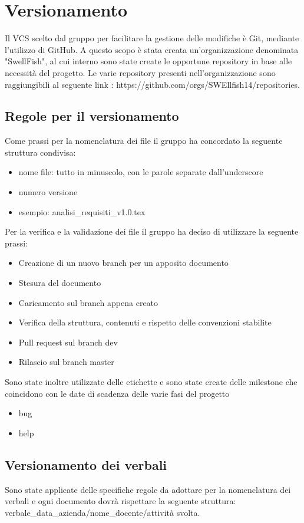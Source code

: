 \documentclass[12pt]{article}
\begin{document}
\section{Versionamento}
Il VCS scelto dal gruppo per facilitare la gestione delle modifiche è Git, mediante l'utilizzo di GitHub.
A questo scopo è stata creata un'organizzazione denominata "SwellFish", al cui interno sono state create le opportune repository in base alle necessità del progetto.
Le varie repository presenti nell'organizzazione sono raggiungibili al seguente link : https://github.com/orgs/SWEllfish14/repositories.
\subsection{Regole per il versionamento}
Come prassi per la nomenclatura dei file il gruppo ha concordato la seguente struttura condivisa:
\begin{itemize}
    \item nome file: tutto in minuscolo, con le parole separate dall'underscore
    \item numero versione
    \item esempio: analisi_requisiti_v1.0.tex
\end{itemize}

Per la verifica e la validazione dei file il gruppo ha deciso di utilizzare la seguente prassi:
\begin{itemize}
    \item Creazione di un nuovo branch per un apposito documento
    \item Stesura del documento
    \item Caricamento sul branch appena creato
    \item Verifica della struttura, contenuti e rispetto delle convenzioni stabilite
    \item Pull request sul branch dev
    \item Rilascio sul branch master
\end{itemize}

Sono state inoltre utilizzate delle etichette e sono state create delle milestone che coincidono con le date di scadenza delle varie fasi del progetto
\begin{itemize}
    \item bug
    \item help

    
\end{itemize}
\subsection{Versionamento dei verbali}
Sono state applicate delle specifiche regole da adottare per la nomenclatura dei verbali e ogni documento dovrà rispettare la seguente struttura: verbale_data_azienda/nome_docente/attività svolta.
\end{document}
